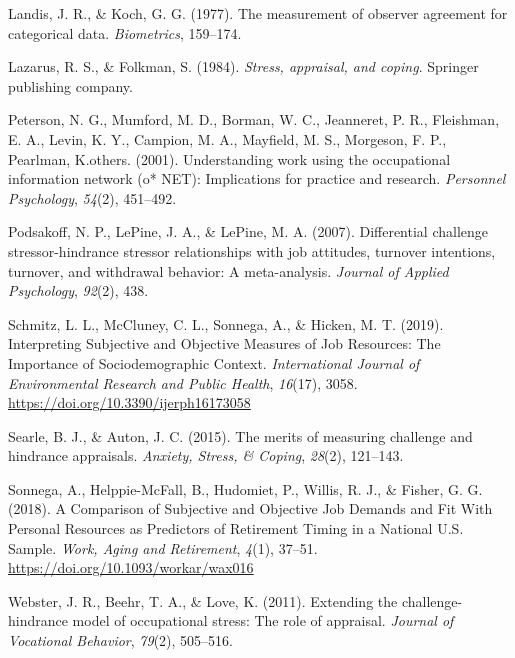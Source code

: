 \documentclass[
  english,
  man]{apa6}
\newlength{\cslhangindent}
\newlength{\cslentryspacingunit} %
\newenvironment{CSLReferences}[2] %
 {%
  \setlength{\parindent}{0pt}
  \ifodd #1
  \let\oldpar\par
  \def\par{\hangindent=\cslhangindent\oldpar}
  \fi
  \setlength{\parskip}{#2\cslentryspacingunit}
 }%
 {}
\begin{document}
\begin{CSLReferences}{1}{0}
\leavevmode{}%
Landis, J. R., \& Koch, G. G. (1977). The measurement of observer agreement for categorical data. \emph{Biometrics}, 159--174.

\leavevmode{}%
Lazarus, R. S., \& Folkman, S. (1984). \emph{Stress, appraisal, and coping}. Springer publishing company.

\leavevmode{}%
Peterson, N. G., Mumford, M. D., Borman, W. C., Jeanneret, P. R., Fleishman, E. A., Levin, K. Y., Campion, M. A., Mayfield, M. S., Morgeson, F. P., Pearlman, K.others. (2001). Understanding work using the occupational information network (o* NET): Implications for practice and research. \emph{Personnel Psychology}, \emph{54}(2), 451--492.

\leavevmode{}%
Podsakoff, N. P., LePine, J. A., \& LePine, M. A. (2007). Differential challenge stressor-hindrance stressor relationships with job attitudes, turnover intentions, turnover, and withdrawal behavior: A meta-analysis. \emph{Journal of Applied Psychology}, \emph{92}(2), 438.

\leavevmode{}%
Schmitz, L. L., McCluney, C. L., Sonnega, A., \& Hicken, M. T. (2019). Interpreting {Subjective} and {Objective} {Measures} of {Job} {Resources}: {The} {Importance} of {Sociodemographic} {Context}. \emph{International Journal of Environmental Research and Public Health}, \emph{16}(17), 3058. \url{https://doi.org/10.3390/ijerph16173058}

\leavevmode{}%
Searle, B. J., \& Auton, J. C. (2015). The merits of measuring challenge and hindrance appraisals. \emph{Anxiety, Stress, \& Coping}, \emph{28}(2), 121--143.

\leavevmode{}%
Sonnega, A., Helppie-McFall, B., Hudomiet, P., Willis, R. J., \& Fisher, G. G. (2018). A {Comparison} of {Subjective} and {Objective} {Job} {Demands} and {Fit} {With} {Personal} {Resources} as {Predictors} of {Retirement} {Timing} in a {National} {U}.{S}. {Sample}. \emph{Work, Aging and Retirement}, \emph{4}(1), 37--51. \url{https://doi.org/10.1093/workar/wax016}

\leavevmode{}%
Webster, J. R., Beehr, T. A., \& Love, K. (2011). Extending the challenge-hindrance model of occupational stress: The role of appraisal. \emph{Journal of Vocational Behavior}, \emph{79}(2), 505--516.

\end{CSLReferences}

\endgroup
\end{document}
